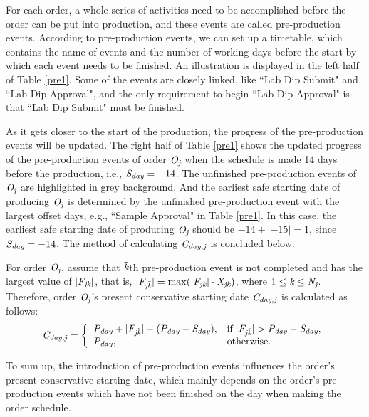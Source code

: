 \documentclass[journal]{IEEEtran}
\theoremstyle{definition}
\begin{document}
For each order, a whole series of activities need to be accomplished before the order can be put into production, and these events are called pre-production events. According to pre-production events, we can set up a timetable, which contains the name of events and the number of working days before the start by which each event needs to be finished. An illustration is displayed in the left half of Table \ref{pre1}. Some of the events are closely linked, like ``Lab Dip Submit" and ``Lab Dip Approval", and the only requirement to begin ``Lab Dip Approval" is that ``Lab Dip Submit" must be finished.

As it gets closer to the start of the production, the progress of the pre-production events will be updated. The right half of Table \ref{pre1} shows the updated progress of the pre-production events of order $\emph{O}_\emph{j}$ when the schedule is made 14 days before the production, i.e., $\emph{S}_\emph{day}=-14$.
The unfinished pre-production events of $\emph{O}_\emph{j}$ are highlighted in grey background. And the earliest safe starting date of producing $\emph{O}_\emph{j}$ is determined by the unfinished pre-production event with the largest offset days, e.g., ``Sample Approval" in Table \ref{pre1}. In this case, the earliest safe starting date of producing $\emph{O}_\emph{j}$ should be $-14+|-15|=1$, since $\emph{S}_\emph{day}=-14$. The method of calculating $\emph{C}_\emph{day,j}$ is concluded below.

For order $\emph{O}_\emph{j}$, assume that $\tilde{\emph{k}}$th pre-production event is not completed and has the largest value of $|\emph{F}_\emph{jk}|$, that is, $|\emph{F}_{\emph{j}\tilde{\emph{k}}}|=\max(|\emph{F}_{\emph{jk}}|\cdot\emph{X}_{\emph{jk}})$, where $1\leq\emph{k}\leq\emph{N}_\emph{j}$. Therefore, order $\emph{O}_\emph{j}$'s present conservative starting date $\emph{C}_\emph{day,j}$ is calculated as follows:
\begin{equation}
 \emph{C}_\emph{day,j}=\left\{
\begin{array}{ll}
\emph{P}_\emph{day}+|\emph{F}_{\emph{j}\tilde{\emph{k}}}|-(\emph{P}_\emph{day}-\emph{S}_\emph{day}), & \textrm{if} \hspace{0.1cm} |\emph{F}_{\emph{j}\tilde{\emph{k}}}|>\emph{P}_\emph{day}-\emph{S}_\emph{day},\\
\emph{P}_\emph{day},       & \textrm{otherwise}.
\end{array} \right.
\label{eq10}
\end{equation}

To sum up, the introduction of pre-production events influences the order's present conservative starting date, which mainly depends on the order's pre-production events which have not been finished on the day when making the order schedule.
\end{document}
